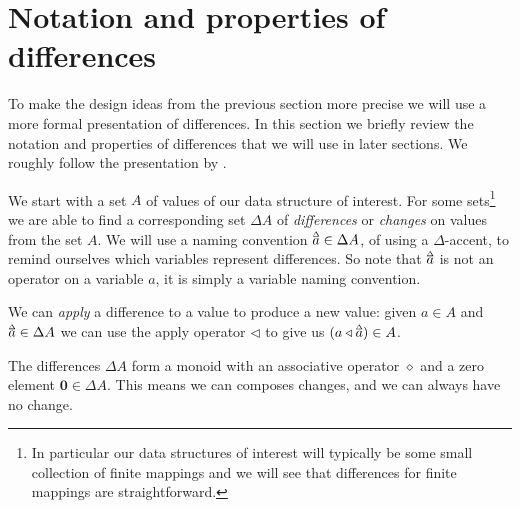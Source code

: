 \documentclass[11pt,a4paper]{article}
\newcommand\deltavar[1]{\accentset{\Delta}{#1}}
\begin{document}
\section{Notation and properties of differences}
\label{notation-differences}

To make the design ideas from the previous section more precise we will use a
more formal presentation of differences.
In this section we briefly review the notation and properties of differences
that we will use in later sections. We roughly follow the presentation by
\cite{change-calculus}.

We start with a set $A$ of values of our data structure of interest. For some
sets\footnote{In particular our data structures of interest will typically be
some small collection of finite mappings and we will see that differences for
finite mappings are straightforward.} we are able to find a corresponding
set $\Delta{A}$ of \emph{differences} or \emph{changes} on values from the set
$A$. We will use a naming convention $\deltavar{a} \in \Delta{A}$, of using a
$\Delta$-accent, to remind ourselves which variables represent differences.
So note that $\deltavar{a}$ is not an operator on a variable $a$, it is simply a
variable naming convention.

We can \emph{apply} a difference to a value to produce a new value: given
$a \in A$ and $\deltavar{a} \in \Delta{A}$ we can use the apply operator
$\triangleleft$ to give us $(a \triangleleft \deltavar{a}) \in A$.

The differences $\Delta{A}$ form a monoid with an associative operator
$\diamond$ and a zero element $\mathbf{0} \in \Delta{A}$. This means we can
composes changes, and we can always have no change.
\end{document}
